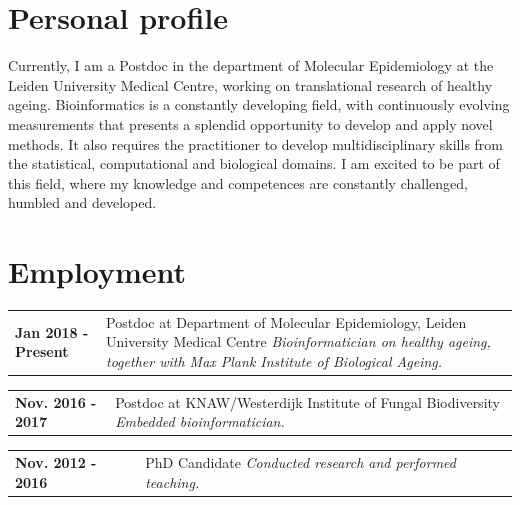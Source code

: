 \documentclass[letterpaper, 10pt]{article} %
\newcommand{\nsection}[1]{
    \section*{\color{MidnightBlue}#1}
  \vspace{-1mm}
}
\newcommand{\entry}[3]{
  \noindent
  \begin{tabular}[t]{p{0.2\textwidth}|p{0.8\textwidth}}
    \textbf{\color{BrickRed}#1} & {#2 \textit{#3}} \\
  \end{tabular}
  \vspace{-2mm}
}
\begin{document}

\nsection{Personal profile}
  \label{sec:persprof}

  Currently, I am a Postdoc in the department of Molecular Epidemiology at the Leiden University Medical Centre, working on translational research of healthy ageing.
  Bioinformatics is a constantly developing field, with continuously evolving measurements that presents a splendid opportunity to develop and apply novel methods.
  It also requires the practitioner to develop multidisciplinary skills from the statistical, computational and biological domains.
  I am excited to be part of this field, where my knowledge and competences are constantly challenged, humbled and developed.
  
  

\nsection{Employment}
	\label{sec:employment}
	
	\entry{Jan 2018 - Present}
	      {Postdoc at Department of Molecular Epidemiology, Leiden University Medical Centre \newline}
	      {Bioinformatician on healthy ageing, together with Max Plank Institute of Biological Ageing. \newline}
	      
	\entry{Nov. 2016 - 2017}
	      {Postdoc at KNAW/Westerdijk Institute of Fungal Biodiversity \newline}
	      {Embedded bioinformatician. \newline}
	      
	\entry{Nov. 2012 - 2016}
	      {PhD Candidate \newline}
	      {Conducted research and performed teaching.}

\end{document}
